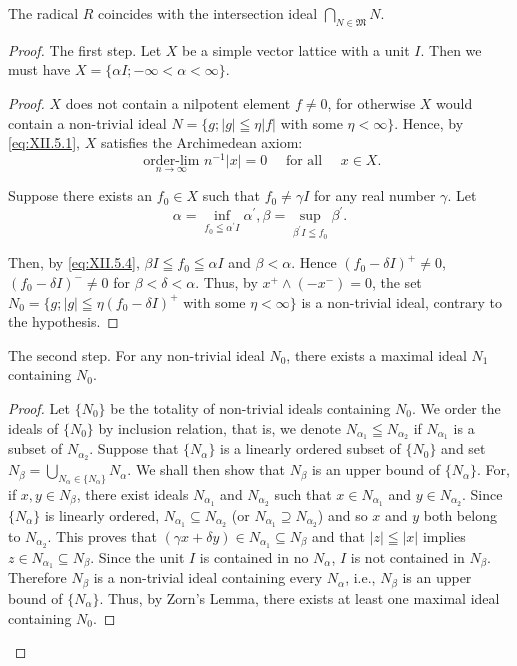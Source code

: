 \begin{theorem}\label{thm:XII.5.Theorem.1} The radical $R$ coincides with the intersection ideal $\bigcap\limits_{N \in \mathfrak{M}} N$. 
\end{theorem}

\begin{proof}
 The first step. Let $X$ be a simple vector lattice with a unit $I$. Then we must have $X = \{\alpha I; -\infty < \alpha < \infty\}$. 


\begin{proof}
 $X$ does not contain a nilpotent element $f \neq 0$, for otherwise $X$ would contain a non-trivial ideal $N = \{g; |g| \leqq \eta |f|$ with some $\eta < \infty\}$. Hence, by \eqref{eq:XII.5.1}, $X$ satisfies the Archimedean axiom: 
\begin{equation}\label{eq:XII.5.4}
\underset {n \rightarrow \infty} {\text{ order-lim }} n ^{-1} | x | = 0 \quad \text{ for all } \quad x \in X. \end{equation}

Suppose there exists an $f_0 \in X$ such that $f_0 \neq \gamma I$ for any real number $\gamma$. Let 
\[
\alpha = \inf\limits _ {f _{0} \leqq \alpha^{\prime} I} \alpha^{\prime}, \beta = \sup\limits _ {\beta^{\prime} I \leqq f _{0}} \beta^{\prime}.
\]

Then, by \eqref{eq:XII.5.4}, $\beta I \leqq f_0 \leqq \alpha I$ and $\beta < \alpha$. Hence $(f_0 - \delta I)^+ \neq 0$, $(f_0 - \delta I)^- \neq 0$ for $\beta < \delta < \alpha$. Thus, by $x^+ \wedge (-x^-) = 0$, the set $N_0 = \{g; |g| \leqq \eta(f_0 - \delta I)^+$ with some $\eta < \infty\}$ is a non-trivial ideal, contrary to the hypothesis. 
\end{proof}

The second step. For any non-trivial ideal $N_0$, there exists a maximal ideal $N_1$ containing $N_0$. 

\begin{proof}
 Let $\{N_0\}$ be the totality of non-trivial ideals containing $N_0$. We order the ideals of $\{N_0\}$ by inclusion relation, that is, we denote $N_{\alpha_1} \leqq N_{\alpha_2}$ if $N_{\alpha_1}$ is a subset of $N_{\alpha_2}$. Suppose that $\{N_\alpha\}$ is a linearly ordered subset of $\{N_0\}$ and set $N_\beta = \bigcup\limits_{N_\alpha \in \{N_\alpha\}} N_\alpha$. We shall then show that $N_\beta$ is an upper bound of $\{N_\alpha\}$. For, if $x, y \in N_\beta$, there exist ideals $N_{\alpha_1}$ and $N_{\alpha_2}$ such that $x \in N_{\alpha_1}$ and $y \in N_{\alpha_2}$. Since $\{N_\alpha\}$ is linearly ordered, $N_{\alpha_1} \subseteq N_{\alpha_2}$ (or $N_{\alpha_1} \supseteq N_{\alpha_2}$) and so $x$ and $y$ both belong to $N_{\alpha_2}$. This proves that $(\gamma x + \delta y) \in N_{\alpha_1} \subseteq N_\beta$ and that $|z| \leqq |x|$ implies $z \in N_{\alpha_1} \subseteq N_\beta$. Since the unit $I$ is contained in no $N_\alpha$, $I$ is not contained in $N_\beta$. Therefore $N_\beta$ is a non-trivial ideal containing every $N_\alpha$, i.e., $N_\beta$ is an upper bound of $\{N_\alpha\}$. Thus, by Zorn's Lemma, there exists at least one maximal ideal containing $N_0$. 
\end{proof}


\end{proof}
